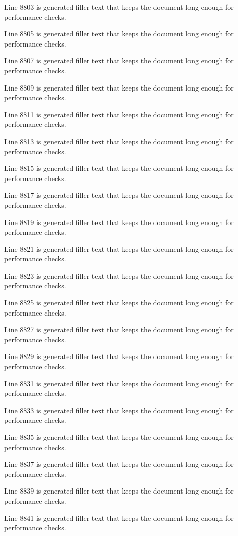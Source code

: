 Line 8803 is generated filler text that keeps the document long enough for performance checks.

Line 8805 is generated filler text that keeps the document long enough for performance checks.

Line 8807 is generated filler text that keeps the document long enough for performance checks.

Line 8809 is generated filler text that keeps the document long enough for performance checks.

Line 8811 is generated filler text that keeps the document long enough for performance checks.

Line 8813 is generated filler text that keeps the document long enough for performance checks.

Line 8815 is generated filler text that keeps the document long enough for performance checks.

Line 8817 is generated filler text that keeps the document long enough for performance checks.

Line 8819 is generated filler text that keeps the document long enough for performance checks.

Line 8821 is generated filler text that keeps the document long enough for performance checks.

Line 8823 is generated filler text that keeps the document long enough for performance checks.

Line 8825 is generated filler text that keeps the document long enough for performance checks.

Line 8827 is generated filler text that keeps the document long enough for performance checks.

Line 8829 is generated filler text that keeps the document long enough for performance checks.

Line 8831 is generated filler text that keeps the document long enough for performance checks.

Line 8833 is generated filler text that keeps the document long enough for performance checks.

Line 8835 is generated filler text that keeps the document long enough for performance checks.

Line 8837 is generated filler text that keeps the document long enough for performance checks.

Line 8839 is generated filler text that keeps the document long enough for performance checks.

Line 8841 is generated filler text that keeps the document long enough for performance checks.

